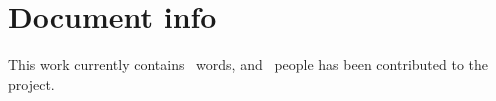 \section{Document info}
This work currently contains \theEntryCounter~words, and \theContributorCounter~people has
been contributed to the project.